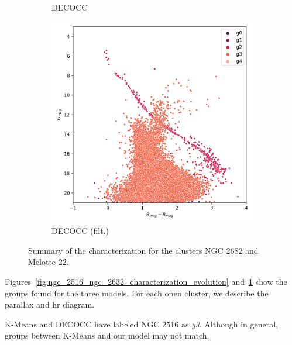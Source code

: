 \documentclass[11pt,a4paper,english,twocolumn]{article}
\begin{document}
\begin{figure}[!hbt]
\begin{subfigure}{0.3\textwidth}
    \caption{DECOCC}
  \end{subfigure}
  \begin{subfigure}{0.3\textwidth}
    \includegraphics[width=\textwidth]{../figures/melotte_22/dec_hr_diagram_filtered_melotte_22.png}
    \caption{DECOCC (filt.)}
  \end{subfigure}
  \caption{Summary of the characterization for the clusters NGC 2682 and Melotte 22.}
  \label{fig:melotte_22_ngc_2682_characterization_evolution}
\end{figure}

Figures~\ref{fig:ngc_2516_ngc_2632_characterization_evolution} and~\ref{fig:melotte_22_ngc_2682_characterization_evolution}
show the groups found for the three models. For each open cluster, we describe the parallax and hr diagram.

K-Means and DECOCC have labeled NGC 2516 as \emph{g3}. Although in general, groups between K-Means and our
model may not match.
\end{document}
